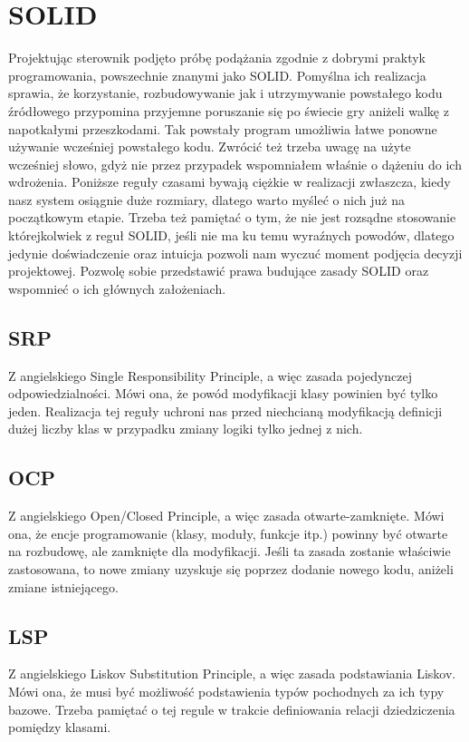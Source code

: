 \chapter{SOLID}
Projektując sterownik podjęto próbę podążania zgodnie z dobrymi praktyk programowania, powszechnie znanymi jako SOLID.
Pomyślna ich realizacja sprawia, że korzystanie, rozbudowywanie jak i utrzymywanie powstałego kodu źródłowego przypomina
przyjemne poruszanie się po świecie gry aniżeli walkę z napotkałymi przeszkodami. 
Tak powstały program umożliwia łatwe ponowne używanie wcześniej powstałego kodu. 
Zwrócić też trzeba uwagę na użyte wcześniej słowo, gdyż nie przez przypadek wspomniałem właśnie o dążeniu do ich wdrożenia.
Poniższe reguły czasami bywają ciężkie w realizacji zwłaszcza, kiedy nasz system osiągnie duże rozmiary, dlatego warto myśleć o nich już na początkowym etapie. 
Trzeba też pamiętać o tym, że nie jest rozsądne stosowanie którejkolwiek z reguł SOLID, jeśli nie ma ku temu wyraźnych powodów, dlatego 
jedynie doświadczenie oraz intuicja pozwoli nam wyczuć moment podjęcia decyzji projektowej.
Pozwolę sobie przedstawić prawa budujące zasady SOLID oraz wspomnieć o ich głównych założeniach.

\section{SRP}
Z angielskiego Single Responsibility Principle, a więc zasada pojedynczej odpowiedzialności.
Mówi ona, że powód modyfikacji klasy powinien być tylko jeden. \autocite[103]{martin2015zwinne}
Realizacja tej reguły uchroni nas przed niechcianą modyfikacją definicji dużej liczby klas w przypadku zmiany logiki tylko jednej z nich.

\section{OCP}
Z angielskiego Open/Closed Principle, a więc zasada otwarte-zamknięte.
Mówi ona, że encje programowanie (klasy, moduły, funkcje itp.) powinny być otwarte na rozbudowę, ale zamknięte dla modyfikacji.\autocite[117]{martin2015zwinne}
Jeśli ta zasada zostanie właściwie zastosowana, to nowe zmiany uzyskuje się poprzez dodanie nowego kodu, aniżeli zmiane istniejącego. 

\section{LSP}
Z angielskiego Liskov Substitution Principle, a więc zasada podstawiania Liskov.
Mówi ona, że musi być możliwość podstawienia typów pochodnych za ich typy bazowe.\autocite[127]{martin2015zwinne}
Trzeba pamiętać o tej regule w trakcie definiowania relacji dziedziczenia pomiędzy klasami.

